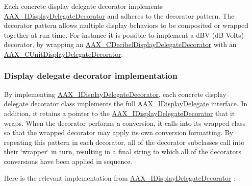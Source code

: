Each concrete display delegate decorator implements \mbox{\hyperlink{a01805}{A\+A\+X\+\_\+\+I\+Display\+Delegate\+Decorator}} and adheres to the decorator pattern. The decorator pattern allows multiple display behaviors to be composited or wrapped together at run time. For instance it is possible to implement a d\+BV (dB Volts) decorator, by wrapping an \mbox{\hyperlink{a01469}{A\+A\+X\+\_\+\+C\+Decibel\+Display\+Delegate\+Decorator}} with an \mbox{\hyperlink{a01585}{A\+A\+X\+\_\+\+C\+Unit\+Display\+Delegate\+Decorator}}.\hypertarget{a00816_displaydelegates_decorators_implementation}{}\subsubsection{Display delegate decorator implementation}\label{a00816_displaydelegates_decorators_implementation}
By implementing \mbox{\hyperlink{a01805}{A\+A\+X\+\_\+\+I\+Display\+Delegate\+Decorator}}, each concrete display delegate decorator class implements the full \mbox{\hyperlink{a01801}{A\+A\+X\+\_\+\+I\+Display\+Delegate}} interface. In addition, it retains a pointer to the \mbox{\hyperlink{a01805}{A\+A\+X\+\_\+\+I\+Display\+Delegate\+Decorator}} that it wraps. When the decorator performs a conversion, it calls into its wrapped class so that the wrapped decorator may apply its own conversion formatting. By repeating this pattern in each decorator, all of the decorator subclasses call into their \char`\"{}wrapper\char`\"{} in turn, resulting in a final string to which all of the decorators\textquotesingle{} conversions have been applied in sequence.

Here is the relevant implementation from \mbox{\hyperlink{a01805}{A\+A\+X\+\_\+\+I\+Display\+Delegate\+Decorator}} \+:


